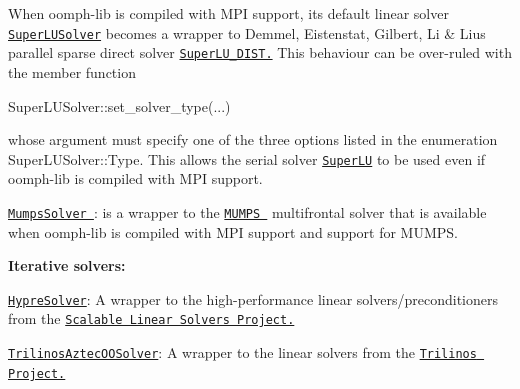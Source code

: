 \begin{DoxyItemize}
\begin{DoxyItemize}
\begin{DoxyItemize}
\item When {\ttfamily oomph-\/lib} is compiled with M\+PI support, its default linear solver \href{../../the_data_structure/html/classoomph_1_1SuperLUSolver.html}{\tt {\ttfamily Super\+L\+U\+Solver}} becomes a wrapper to Demmel, Eistenstat, Gilbert, Li \& Liu\textquotesingle{}s parallel sparse direct solver \href{http://crd.lbl.gov/~xiaoye/SuperLU#superlu_dist}{\tt Super\+L\+U\+\_\+\+D\+I\+ST.} This behaviour can be over-\/ruled with the member function 
\begin{DoxyCode}
SuperLUSolver::set\_solver\_type(...)
\end{DoxyCode}
 whose argument must specify one of the three options listed in the enumeration {\ttfamily Super\+L\+U\+Solver\+::\+Type}. This allows the serial solver \href{http://crd.lbl.gov/~xiaoye/SuperLU}{\tt Super\+LU} to be used even if {\ttfamily oomph-\/lib} is compiled with M\+PI support. ~\newline
~\newline

\item \href{../../the_data_structure/html/classoomph_1_1MumpsSolver.html}{\tt {\ttfamily  Mumps\+Solver }}\+: is a wrapper to the \href{http://graal.ens-lyon.fr/MUMPS/}{\tt M\+U\+M\+PS } multifrontal solver that is available when {\ttfamily oomph-\/lib} is compiled with M\+PI support and support for M\+U\+M\+PS.
\end{DoxyItemize}
\item {\bfseries Iterative solvers\+:} ~\newline
~\newline

\begin{DoxyItemize}
\item \href{../../the_data_structure/html/classoomph_1_1HypreSolver.html}{\tt {\ttfamily Hypre\+Solver}}\+: A wrapper to the high-\/performance linear solvers/preconditioners from the \href{https://computation.llnl.gov/casc/linear_solvers/sls_hypre.html}{\tt Scalable Linear Solvers Project.} ~\newline
~\newline

\item \href{../../the_data_structure/html/classoomph_1_1TrilinosAztecOOSolver.html}{\tt {\ttfamily Trilinos\+Aztec\+O\+O\+Solver}}\+: A wrapper to the linear solvers from the \href{http://trilinos.sandia.gov/}{\tt Trilinos Project.}~\newline
~\newline

\end{DoxyItemize}
\end{DoxyItemize}
\end{DoxyItemize}



